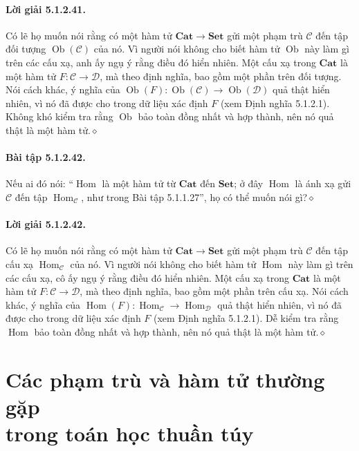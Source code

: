 \paragraph{Lời giải 5.1.2.41.} Có lẽ họ muốn nói rằng có một hàm tử $\mathbf{Cat}\to\mathbf{Set}$ gửi một phạm trù $\mathcal C$ đến tập đối tượng $\operatorname{Ob}(\mathcal C)$ của nó. Vì người nói không cho biết hàm tử $\operatorname{Ob}$ này làm gì trên các cấu xạ, anh ấy ngụ ý rằng điều đó hiển nhiên. Một cấu xạ trong $\mathbf{Cat}$ là một hàm tử $F:\mathcal C\to\mathcal D$, mà theo định nghĩa, bao gồm một phần trên đối tượng. Nói cách khác, ý nghĩa của $\operatorname{Ob}(F):\operatorname{Ob}(\mathcal C)\to\operatorname{Ob}(\mathcal D)$ quả thật hiển nhiên, vì nó đã được cho trong dữ liệu xác định $F$ (xem Định nghĩa 5.1.2.1). Không khó kiểm tra rằng $\operatorname{Ob}$ bảo toàn đồng nhất và hợp thành, nên nó quả thật là một hàm tử.\hfill$\diamond$
\paragraph{Bài tập 5.1.2.42.} Nếu ai đó nói: ``$\operatorname{Hom}$ là một hàm tử từ $\mathbf{Cat}$ đến $\mathbf{Set}$; ở đây $\operatorname{Hom}$ là ánh xạ gửi $\mathcal C$ đến tập $\operatorname{Hom}_{\mathcal C}$, như trong Bài tập 5.1.1.27'', họ có thể muốn nói gì?\hfill$\diamond$
\paragraph{Lời giải 5.1.2.42.} Có lẽ họ muốn nói rằng có một hàm tử $\mathbf{Cat}\to\mathbf{Set}$ gửi một phạm trù $\mathcal C$ đến tập cấu xạ $\operatorname{Hom}_{\mathcal C}$ của nó. Vì người nói không cho biết hàm tử $\operatorname{Hom}$ này làm gì trên các cấu xạ, cô ấy ngụ ý rằng điều đó hiển nhiên. Một cấu xạ trong $\mathbf{Cat}$ là một hàm tử $F:\mathcal C\to\mathcal D$, mà theo định nghĩa, bao gồm một phần trên cấu xạ. Nói cách khác, ý nghĩa của $\operatorname{Hom}(F):\operatorname{Hom}_{\mathcal C}\to\operatorname{Hom}_{\mathcal D}$ quả thật hiển nhiên, vì nó đã được cho trong dữ liệu xác định $F$ (xem Định nghĩa 5.1.2.1). Dễ kiểm tra rằng $\operatorname{Hom}$ bảo toàn đồng nhất và hợp thành, nên nó quả thật là một hàm tử.\hfill$\diamond$
\section{Các phạm trù và hàm tử thường gặp\texorpdfstring{\\}{ }trong toán học thuần túy}
